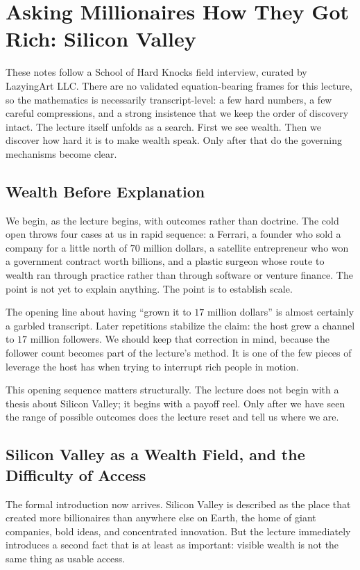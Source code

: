 \chapter{Asking Millionaires How They Got Rich: Silicon Valley}

These notes follow a School of Hard Knocks field interview, curated by LazyingArt LLC. There are no validated equation-bearing frames for this lecture, so the mathematics is necessarily transcript-level: a few hard numbers, a few careful compressions, and a strong insistence that we keep the order of discovery intact. The lecture itself unfolds as a search. First we see wealth. Then we discover how hard it is to make wealth speak. Only after that do the governing mechanisms become clear.

\section{Wealth Before Explanation}

We begin, as the lecture begins, with outcomes rather than doctrine. The cold open throws four cases at us in rapid sequence: a Ferrari, a founder who sold a company for a little north of \(70\) million dollars, a satellite entrepreneur who won a government contract worth billions, and a plastic surgeon whose route to wealth ran through practice rather than through software or venture finance. The point is not yet to explain anything. The point is to establish scale.

The opening line about having ``grown it to \(17\) million dollars'' is almost certainly a garbled transcript. Later repetitions stabilize the claim: the host grew a channel to \(17\) million followers. We should keep that correction in mind, because the follower count becomes part of the lecture's method. It is one of the few pieces of leverage the host has when trying to interrupt rich people in motion.

This opening sequence matters structurally. The lecture does not begin with a thesis about Silicon Valley; it begins with a payoff reel. Only after we have seen the range of possible outcomes does the lecture reset and tell us where we are.

\section{Silicon Valley as a Wealth Field, and the Difficulty of Access}

The formal introduction now arrives. Silicon Valley is described as the place that created more billionaires than anywhere else on Earth, the home of giant companies, bold ideas, and concentrated innovation. But the lecture immediately introduces a second fact that is at least as important: visible wealth is not the same thing as usable access.

